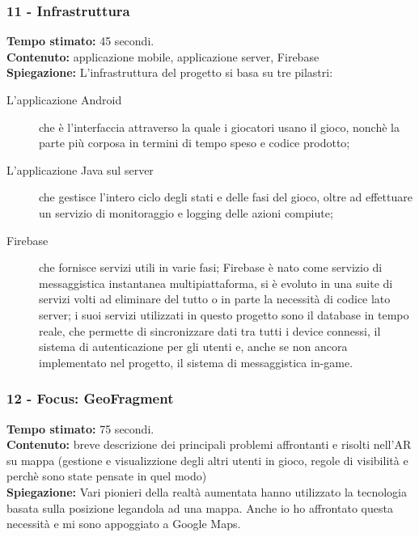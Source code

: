 \documentclass[
	twoside]				%
	{toptesi}				%
\begin{document}
	\subsubsection{11 - Infrastruttura}
	
	\textbf{Tempo stimato:} 45 secondi. \\
	
	\textbf{Contenuto:} applicazione mobile, applicazione server, Firebase \\
	
	\textbf{Spiegazione:} L'infrastruttura del progetto si basa su tre pilastri:
	\begin{description}
		\item[L'applicazione Android] che è l'interfaccia attraverso la quale i giocatori usano il gioco, nonchè la parte più corposa in termini di tempo speso e codice prodotto;
		
		\item[L'applicazione Java sul server] che gestisce l'intero ciclo degli stati e delle fasi del gioco, oltre ad effettuare un servizio di monitoraggio e logging delle azioni compiute;
		
		\item[Firebase] che fornisce servizi utili in varie fasi; Firebase è nato come servizio di messaggistica instantanea multipiattaforma, si è evoluto in una suite di servizi volti ad eliminare del tutto o in parte la necessità di codice lato server; i suoi servizi utilizzati in questo progetto sono il database in tempo reale, che permette di sincronizzare dati tra tutti i device connessi, il sistema di autenticazione per gli utenti e, anche se non ancora implementato nel progetto, il sistema di messaggistica in-game.
	\end{description}
	
	\subsubsection{12 - Focus: GeoFragment}
	
	\textbf{Tempo stimato:} 75 secondi. \\
	
	\textbf{Contenuto:} breve descrizione dei principali problemi affrontanti e risolti nell'AR su mappa (gestione e visualizzione degli altri utenti in gioco, regole di visibilità e perchè sono state pensate in quel modo) \\
	
	\textbf{Spiegazione:} Vari pionieri della realtà aumentata hanno utilizzato la tecnologia basata sulla posizione legandola ad una mappa. Anche io ho affrontato questa necessità e mi sono appoggiato a Google Maps.
	
\end{document}
